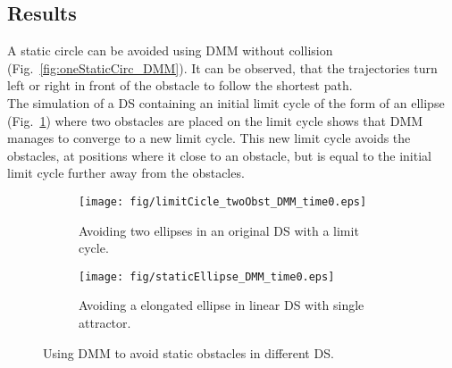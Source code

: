 \subsection{Results}
A static circle can be avoided using DMM without collision (Fig.~\ref{fig:oneStaticCirc_DMM}). It can be observed, that the trajectories turn left or right in front of the obstacle to follow the shortest path. \\
The simulation of a DS containing an initial limit cycle of the form of an ellipse (Fig.~\ref{fig:limitCicle_twoObst_DMM_time0}) where two obstacles are placed on the limit cycle shows that DMM manages to converge to a new limit cycle. This new limit cycle avoids the obstacles, at positions where it close to an obstacle, but is equal to the initial limit cycle further away from the obstacles.
\begin{figure}[tb]\centering
\begin{subfigure}{.48\columnwidth} %
\centering
\texttt{[image: fig/limitCicle\_twoObst\_DMM\_time0.eps]}
\caption{Avoiding two ellipses in an original DS with a limit cycle.}
\label{fig:limitCicle_twoObst_DMM_time0}
\end{subfigure}
\begin{subfigure}{.48\columnwidth} %
\centering
\texttt{[image: fig/staticEllipse\_DMM\_time0.eps]}
\caption{Avoiding a elongated ellipse in linear DS with single attractor.}
\label{fig:staticEllipse_DMM_time0}
\end{subfigure}
\caption{Using DMM to avoid static obstacles in different DS.}
\label{fig:static_DMM}
\end{figure}



